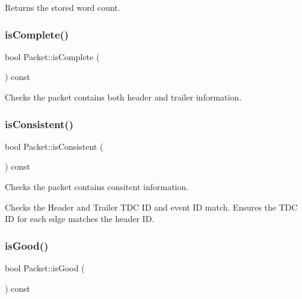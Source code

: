 Returns the stored word count. 

\mbox{\label{class_packet_a6b5ce354c03663c98cccd31ad9a6f5ff}} 
\subsubsection{\texorpdfstring{is\+Complete()}{isComplete()}}
{\footnotesize\ttfamily bool Packet\+::is\+Complete (\begin{DoxyParamCaption}{ }\end{DoxyParamCaption}) const}



Checks the packet contains both header and trailer information. 

\mbox{\label{class_packet_a8d9e544f6f56389fa13bb01b2d37ca58}} 
\subsubsection{\texorpdfstring{is\+Consistent()}{isConsistent()}}
{\footnotesize\ttfamily bool Packet\+::is\+Consistent (\begin{DoxyParamCaption}{ }\end{DoxyParamCaption}) const}



Checks the packet contains consitent information. 

Checks the Header and Trailer T\+DC ID and event ID match. Ensures the T\+DC ID for each edge matches the header ID. \mbox{\label{class_packet_ae70511a50e1f186b8a3369ee6ab8589c}} 
\subsubsection{\texorpdfstring{is\+Good()}{isGood()}}
{\footnotesize\ttfamily bool Packet\+::is\+Good (\begin{DoxyParamCaption}{ }\end{DoxyParamCaption}) const\hspace{0.3cm}{\ttfamily [inline]}}



